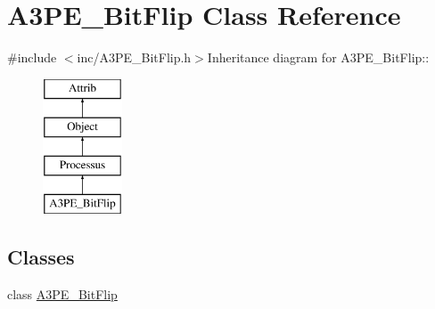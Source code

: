 \hypertarget{classA3PE__BitFlip}{
\section{A3PE\_\-BitFlip Class Reference}
\label{classA3PE__BitFlip}
}


{\ttfamily \#include $<$inc/A3PE\_\-BitFlip.h$>$}Inheritance diagram for A3PE\_\-BitFlip::\begin{figure}[H]
\begin{center}
\leavevmode
\includegraphics[height=4cm]{classA3PE__BitFlip}
\end{center}
\end{figure}
\subsection*{Classes}
\begin{DoxyCompactItemize}
\item 
class \hyperlink{classA3PE__BitFlip_1_1A3PE__BitFlip}{A3PE\_\-BitFlip}
\end{DoxyCompactItemize}
